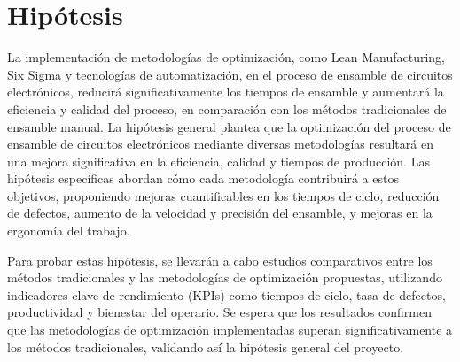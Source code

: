 \section{Hipótesis}
% 
% 
% 
% 
La implementación de metodologías de optimización, como Lean Manufacturing, Six Sigma y tecnologías de automatización, en el proceso de ensamble de circuitos electrónicos, reducirá significativamente los tiempos de ensamble y aumentará la eficiencia y calidad del proceso, en comparación con los métodos tradicionales de ensamble manual.
La hipótesis general plantea que la optimización del proceso de ensamble de circuitos electrónicos mediante diversas metodologías resultará en una mejora significativa en la eficiencia, calidad y tiempos de producción. Las hipótesis específicas abordan cómo cada metodología contribuirá a estos objetivos, proponiendo mejoras cuantificables en los tiempos de ciclo, reducción de defectos, aumento de la velocidad y precisión del ensamble, y mejoras en la ergonomía del trabajo.

Para probar estas hipótesis, se llevarán a cabo estudios comparativos entre los métodos tradicionales y las metodologías de optimización propuestas, utilizando indicadores clave de rendimiento (KPIs) como tiempos de ciclo, tasa de defectos, productividad y bienestar del operario. Se espera que los resultados confirmen que las metodologías de optimización implementadas superan significativamente a los métodos tradicionales, validando así la hipótesis general del proyecto.
% 
%  
